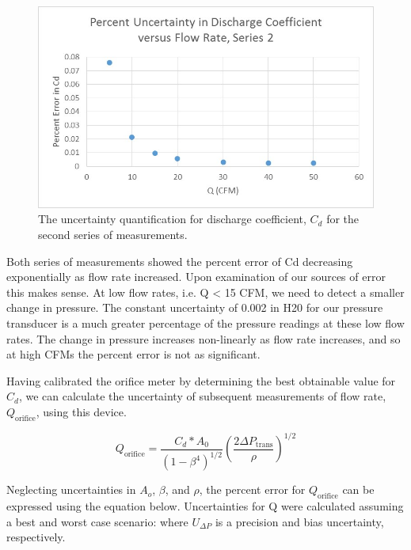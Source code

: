 \documentclass{article}
\begin{document}
  \begin{figure}[!htb]
   \begin{center}
    \includegraphics[width = 12 cm]{figs/PercentUncertaintyCdVsQ_Series2.jpg}
    \caption{The uncertainty quantification for discharge coefficient, $C_d$ for the second series of measurements.}
    \label{orif-s2}
   \end{center}
  \end{figure}

Both series of measurements showed the percent error of Cd decreasing exponentially as flow 
rate increased. Upon examination of our sources of error this makes sense. At low flow rates, i.e. Q < 15 
CFM, we need to detect a smaller change in pressure. The constant uncertainty of 0.002 in H20 for our 
pressure transducer is a much greater percentage of the pressure readings at these low flow rates. The 
change in pressure increases non-linearly as flow rate increases, and so at high CFMs the percent error is 
not as significant.

Having calibrated the orifice meter by determining the best obtainable value for $C_d$, we can 
calculate the uncertainty of subsequent measurements of flow rate, $Q_{\text{orifice}}$, using this device.

\begin{equation}
  Q_{\text{orifice}} = \frac{C_d * A_0}{(1-\beta^4)^{1/2}} \left(\frac{2 \Delta P_{\text{trans}}}{\rho}\right)^{1/2}
\end{equation}

Neglecting uncertainties in $A_o$, $\beta$, and $\rho$, the percent error for $Q_{\text{orifice}}$ 
can be expressed using the equation below. Uncertainties for Q were calculated 
assuming a best and worst case scenario: where $U_{\Delta P}$ is a precision
 and bias uncertainty, respectively.
\end{document}
